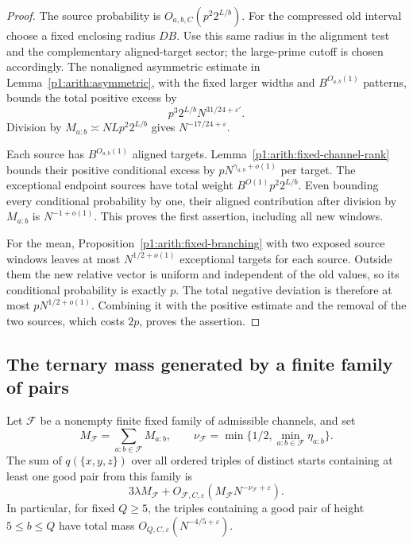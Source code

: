 \begin{proof}
The source probability is \(O_{a,b,C}(p^2 2^{L/b})\).
For the compressed old interval choose a fixed enclosing radius \(DB\).
Use this same radius in the alignment test and the complementary
aligned-target sector; the large-prime cutoff is chosen accordingly.
The nonaligned asymmetric estimate
in Lemma~\ref{p1:arith:asymmetric}, with the fixed larger widths and
\(B^{O_{a,b}(1)}\) patterns, bounds the total positive excess by
\[
 p^3 2^{L/b}N^{31/24+\varepsilon'}.
\]
Division by \(M_{a:b}\asymp NLp^2 2^{L/b}\) gives
\(N^{-17/24+\varepsilon}\).

Each source has \(B^{O_{a,b}(1)}\) aligned targets.
Lemma~\ref{p1:arith:fixed-channel-rank} bounds their positive conditional
excess by \(pN^{\gamma_{a:b}+o(1)}\) per target.
The exceptional endpoint sources have total weight
\(B^{O(1)}p^2 2^{L/b}\).
Even bounding every conditional probability by one, their aligned
contribution after division by \(M_{a:b}\) is \(N^{-1+o(1)}\).
This proves the first assertion, including all new windows.

For the mean, Proposition~\ref{p1:arith:fixed-branching} with two
exposed source windows leaves at most \(N^{1/2+o(1)}\) exceptional
targets for each source.
Outside them the new relative vector is uniform and independent of
the old values, so its conditional probability is exactly \(p\).
The total negative deviation is therefore at most \(pN^{1/2+o(1)}\).
Combining it with the positive estimate and the removal of the two
sources, which costs \(2p\), proves the assertion.
\end{proof}

\subsection{The ternary mass generated by a finite family of pairs}

\begin{corollary}
\label{p1:arith:finite-family-triples}
Let \(\mathcal F\) be a nonempty finite fixed family of admissible
channels, and set
\[
 M_{\mathcal F}=\sum_{a:b\in\mathcal F}M_{a:b},\qquad
 \nu_{\mathcal F}=
 \min\{1/2,\min_{a:b\in\mathcal F}\eta_{a:b}\}.
\]
The sum of \(q(\{x,y,z\})\) over all ordered triples of distinct starts
containing at least one good pair from this family is
\[
 3\lambda M_{\mathcal F}
 +O_{\mathcal F,C,\varepsilon}
    (M_{\mathcal F}N^{-\nu_{\mathcal F}+\varepsilon}).
\]
In particular, for fixed \(Q\geq5\), the triples containing a good
pair of height \(5\leq b\leq Q\) have total mass
\(O_{Q,C,\varepsilon}(N^{-4/5+\varepsilon})\).
\end{corollary}

